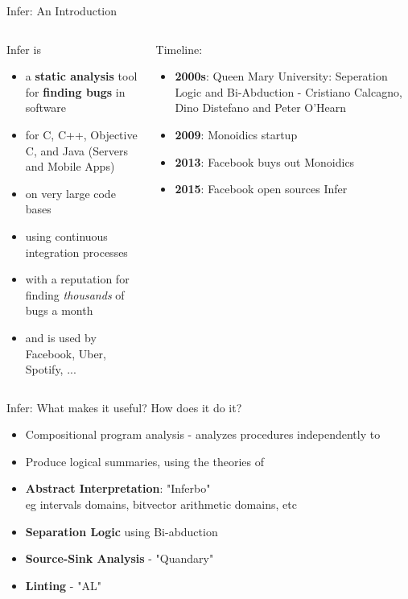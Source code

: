
\begin{frame}{Infer: An Introduction}
\begin{columns}
	\begin{column}{0.5\textwidth}
		Infer is
		\begin{itemize}
			\item a \textbf{static analysis} tool for \textbf{finding bugs} in software
			\item for C, C++, Objective C, and Java (Servers and Mobile Apps)
			\item on very large code bases
			\item using continuous integration processes
			\item with a reputation for finding \textit{thousands} of bugs a month
			\item and is used by Facebook, Uber, Spotify, ...
		\end{itemize}
	\end{column}
	\begin{column}{0.5\textwidth}  %
		Timeline:
		\begin{itemize}
			\item \textbf{2000s}: Queen Mary University: Seperation Logic and Bi-Abduction - Cristiano Calcagno, Dino Distefano and Peter O'Hearn 
			\item \textbf{2009}: Monoidics startup
			\item \textbf{2013}: Facebook buys out Monoidics
			\item \textbf{2015}: Facebook open sources Infer
		\end{itemize}
	\end{column}
\end{columns}
\end{frame}

\begin{frame}{Infer: What makes it useful?}
	How does it do it?
	\begin{itemize}
		\item Compositional program analysis - analyzes procedures independently  to
		\item Produce logical summaries, using the theories of 
		\item \textbf{Abstract Interpretation}: "Inferbo"
		\\eg intervals domains, bitvector arithmetic domains, etc
		\item \textbf{Separation Logic} using Bi-abduction
		\item \textbf{Source-Sink Analysis} - "Quandary"
		\item \textbf{Linting} - "AL" 
	\end{itemize}
\end{frame}

